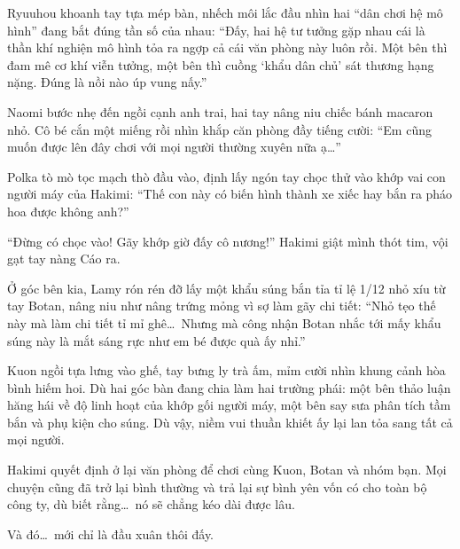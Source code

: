 \documentclass[../main.tex]{subfiles}
\begin{document}
Ryuuhou khoanh tay tựa mép bàn, nhếch môi lắc đầu nhìn hai ``dân chơi hệ mô hình'' đang bắt đúng tần số của nhau: ``Đấy, hai hệ tư tưởng gặp nhau cái là thần khí nghiện mô hình tỏa ra ngợp cả cái văn phòng này luôn rồi. Một bên thì đam mê cơ khí viễn tưởng, một bên thì cuồng `khẩu dân chủ' sát thương hạng nặng. Đúng là nồi nào úp vung nấy.''

Naomi bước nhẹ đến ngồi cạnh anh trai, hai tay nâng niu chiếc bánh macaron nhỏ. Cô bé cắn một miếng rồi nhìn khắp căn phòng đầy tiếng cười: ``Em cũng muốn được lên đây chơi với mọi người thường xuyên nữa ạ\dots''

Polka tò mò tọc mạch thò đầu vào, định lấy ngón tay chọc thử vào khớp vai con người máy của Hakimi: ``Thế con này có biến hình thành xe xiếc hay bắn ra pháo hoa được không anh?''

``Đừng có chọc vào! Gãy khớp giờ đấy cô nương!'' Hakimi giật mình thót tim, vội gạt tay nàng Cáo ra.

Ở góc bên kia, Lamy rón rén đỡ lấy một khẩu súng bắn tỉa tỉ lệ 1/12 nhỏ xíu từ tay Botan, nâng niu như nâng trứng mỏng vì sợ làm gãy chi tiết: ``Nhỏ tẹo thế này mà làm chi tiết tỉ mỉ ghê\dots\ Nhưng mà công nhận Botan nhắc tới mấy khẩu súng này là mắt sáng rực như em bé được quà ấy nhỉ.''

Kuon ngồi tựa lưng vào ghế, tay bưng ly trà ấm, mỉm cười nhìn khung cảnh hòa bình hiếm hoi. Dù hai góc bàn đang chia làm hai trường phái: một bên thảo luận hăng hái về độ linh hoạt của khớp gối người máy, một bên say sưa phân tích tầm bắn và phụ kiện cho súng. Dù vậy, niềm vui thuần khiết ấy lại lan tỏa sang tất cả mọi người.

Hakimi quyết định ở lại văn phòng để chơi cùng Kuon, Botan và nhóm bạn. Mọi chuyện cũng đã trở lại bình thường và trả lại sự bình yên vốn có cho toàn bộ công ty, dù biết rằng\dots\ nó sẽ chẳng kéo dài được lâu.

Và đó\dots\ mới chỉ là đầu xuân thôi đấy.
\end{document}
